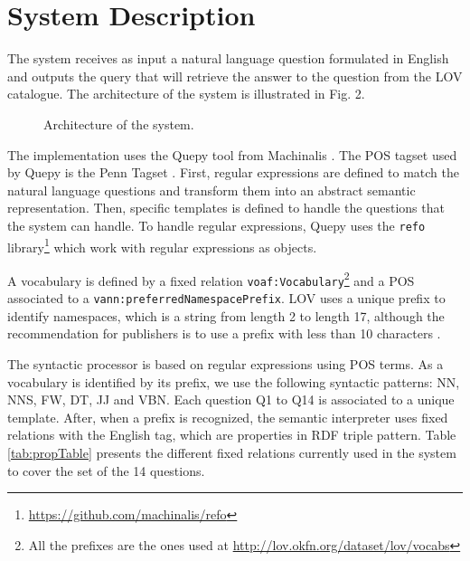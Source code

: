 \documentclass[runningheads,a4paper]{llncs}
\begin{document}
\section{System Description}
\label{sec:system}

The system receives as input a natural language question formulated in English
and outputs the query that will retrieve the answer to the question from the
LOV catalogue. The architecture of the system is illustrated in Fig. 2.

\begin{figure}[ht!b]
\centering
\caption{Architecture of the system.}
\label{fig:q4lovarchi}
\end{figure}

The implementation uses the Quepy tool from Machinalis \cite{quepy2012}. The POS tagset used by Quepy is the Penn Tagset \cite{marcus1993building}. First, regular expressions are defined to match the natural language questions and transform them into an abstract semantic representation. Then, specific templates is defined to handle the questions that the system can handle. To handle regular expressions, Quepy uses the \texttt{refo} library\footnote{\url{https://github.com/machinalis/refo}} which work with regular expressions as objects. 

A vocabulary is defined by a fixed relation \texttt{voaf:Vocabulary}\footnote{All the prefixes are the ones used at \url{http://lov.okfn.org/dataset/lov/vocabs}} and a POS associated to a \texttt{vann:preferredNamespacePrefix}. LOV uses a unique prefix to identify namespaces, which is a string from length 2 to length 17, although the recommendation for publishers is to use a prefix with less than 10 characters \cite{pybernard12}.  

The syntactic processor is based on regular expressions using POS terms. As a vocabulary is identified by its prefix, we use  the following syntactic patterns: NN, NNS, FW, DT, JJ and VBN. Each question Q1 to Q14 is associated to a unique template. After, when a prefix is recognized, the semantic interpreter uses fixed relations with the English tag, which are properties in RDF triple pattern. Table \ref{tab:propTable} presents the different fixed relations currently used in the system to cover the set of the 14 questions.
\end{document}

